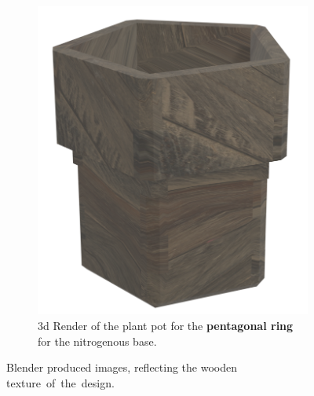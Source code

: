 \documentclass[12pt]{extarticle} %
\begin{document}
\begin{figure}[ht]
\begin{subfigure}[b]{0.43\textwidth}
         \includegraphics[width=\textwidth]{images/screenshots/pentagonpot.png}
         \caption{3d Render of the plant pot for the \textbf{pentagonal ring} for the nitrogenous base.}
         \label{fig:pent_pot}
     \end{subfigure}
     \caption{Blender produced images, reflecting the wooden texture of the design.}
\end{figure}
\end{document}

